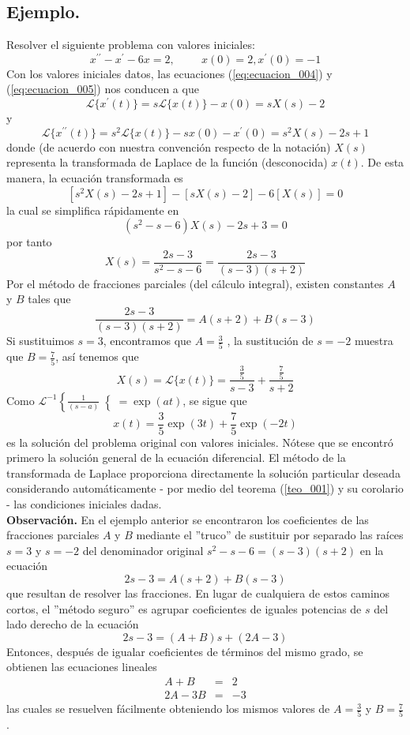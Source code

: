 \subsection*{Ejemplo.}
Resolver el siguiente problema con valores iniciales:
\[ x^{\prime \prime} - x^{\prime} - 6 x = 2, \hspace{1cm} x(0)=2, x^{\prime}(0) = -1 \]
Con los valores iniciales datos, las ecuaciones (\ref{eq:ecuacion_004}) y (\ref{eq:ecuacion_005}) nos conducen a que
\[ \mathscr{L} \{ x^{\prime}(t) \} = s \mathscr{L} \{ x(t) \} - x(0) =  s X(s) - 2  \]
y
\[ \mathscr{L} \{ x^{\prime \prime}(t) \} = s^{2} \mathscr{L} \{ x(t) \} - s x(0) - x^{\prime} (0) =  s^{2} X(s) - 2s +1  \]
donde (de acuerdo con nuestra convención respecto de la notación) $X(s)$ representa la transformada de Laplace de la función (desconocida) $x(t)$. De esta manera, la ecuación transformada es
\[ [ s^{2} X(s) - 2s + 1 ] - [ s  X(s) - 2 ] - 6 [ X(s) ] = 0 \]
la cual se simplifica rápidamente en
\[ (s^{2} - s - 6) X(s) - 2s + 3 = 0 \]
por tanto
\[ X(s) = \dfrac{2s - 3}{s^{2} - s - 6} = \dfrac{2s -3}{(s-3) (s+2)} \]
Por el método de fracciones parciales (del cálculo integral), existen constantes $A$ y $B$ tales que
\[ \dfrac{2s -3}{(s-3) (s+2)} =  A (s +2 ) + B (s -3 ) \]
Si sustituimos $s=3$, encontramos que $A=\frac{3}{5}$ , la sustitución de $s=-2$ muestra que $B=\frac{7}{5}$, así tenemos que
\[ X(s) = \mathscr{L} \{ x(t) \} = \dfrac{\frac{3}{5}}{s-3} + \dfrac{\frac{7}{5}}{s+2} \]
Como $\mathscr{L}^{-1} \left\lbrace \frac{1}{(s-a)} \right\lbrace =  \exp(at)$, se sigue que
\[ x(t) = \dfrac{3}{5} \exp(3t) + \dfrac{7}{5} \exp(-2t) \]
es la solución del problema original con valores iniciales. Nótese que se encontró primero la solución general de la ecuación diferencial. El método de la transformada de Laplace proporciona directamente la solución particular deseada considerando automáticamente  - por medio del teorema (\ref{teo_001}) y su corolario - las condiciones iniciales dadas.
\\
\textbf{Observación. } En el ejemplo anterior se encontraron los coeficientes de las fracciones parciales $A$ y $B$ mediante el ''truco'' de sustituir por separado las raíces $s = 3$ y $s = -2$ del denominador original $s^{2} - s - 6 = (s - 3) (s +2)$ en la ecuación
\[ 2s - 3 =  A(s+2) + B(s-3) \]
que resultan de resolver las fracciones. En lugar de cualquiera de estos caminos cortos, el ''método seguro'' es agrupar coeficientes de iguales potencias de $s$ del lado derecho de la ecuación
\[ 2s - 3 = (A + B) s + (2A -3) \]
Entonces, después de igualar coeficientes de términos del mismo grado, se obtienen las ecuaciones lineales
\begin{eqnarray*}
A + B &=& 2 \nonumber \\
2A - 3B &=& -3 \nonumber
\end{eqnarray*}
las cuales se resuelven fácilmente obteniendo los mismos valores de $A = \frac{3}{5}$ y $B = \frac{7}{5}$.
